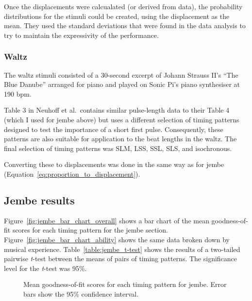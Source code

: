 \documentclass[12pt,twoside,openright]{report}
\begin{document}
Once the displacements were calcualated (or derived from data), the probability distributions for the stimuli could be created, using the displacement as the mean. They used the standard deviations that were found in the data analysis to try to maintain the expressivity of the performance.

\subsubsection{Waltz} \label{waltz_stimuli}

The waltz stimuli consisted of a 30-second excerpt of Johann Strauss II's ``The
Blue Danube'' arranged for piano and played on Sonic Pi's piano synthesiser at
190 bpm.

Table 3 in Neuhoff et al.\ contains similar
pulse-length data to their Table 4 (which I used for jembe above) but uses a different
selection of timing patterns designed to test the importance of a short first
pulse. Consequently, these patterns are also suitable for application to the
beat lengths in the waltz. The final selection of timing patterns was SLM, LSS,
SSL, SLS, and isochronous.

Converting these to displacements was done in the same way as for jembe (Equation~\ref{eq:proportion_to_displacement}).


\subsection{Jembe results} \label{user_study_jembe_results}

Figure~\ref{fig:jembe_bar_chart_overall} shows a bar chart of the mean goodness-of-fit scores for each timing
pattern for the jembe section. Figure~\ref{fig:jembe_bar_chart_ability} shows the same data broken down by
musical experience. Table~\ref{table:jembe_t-test} shows the results of a two-tailed pairwise \textit{t}-test between the means of pairs of timing patterns. The significance level for the \textit{t}-test was 95\%.

\begin{figure}[ht]
    \centering
    \caption{Mean goodness-of-fit scores for each timing pattern for jembe. Error bars show the 95\% confidence interval.}
    \label{fig:jembe_bar_charts}
\end{figure}
\end{document}
